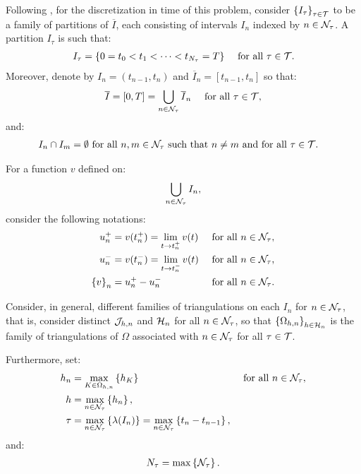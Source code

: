 Following \cite{Feistauer2007}, for the discretization in time of this problem, consider $\left\{ I_{\tau} \right\}_{\tau \in \mathcal{T}}$ to be a family of partitions of $\overline{I}$, each consisting of intervals $I_n$ indexed by $n \in \mathcal{N}_{\tau}$. A partition $I_{\tau}$ is such that:
\begin{align}
    I_{\tau} &= \left\{ 0 = t_0 < t_1 < \dots < t_{N_\tau} = T \right\} &\text{ for all } \tau \in \mathcal{T}.
\end{align}
Moreover, denote by $I_n = \left( t_{n - 1}, t_n \right)$ and $\overline{I}_n = \left[ t_{n - 1}, t_n \right]$ so that:
\begin{align}
    \overline{I} &= \left[ 0, T \right] = \bigcup_{n \in \mathcal{N}_{\tau}} \overline{I}_n &\text{ for all } \tau \in \mathcal{T},
\end{align}
and:
\begin{align}
    I_n \cap I_m = \emptyset &\text{ for all } n, m \in \mathcal{N}_{\tau} \text{ such that } n \neq m \text{ and for all } \tau \in \mathcal{T}.
\end{align}

For a function $v$ defined on:
\begin{align}
    \bigcup_{n \in \mathcal{N}_{\tau}} I_n,
\end{align}
consider the following notations:
\begin{align}
    u_n^+ &= v(t_n^+) = \lim_{t \rightarrow t_n^+} v(t) &\text{ for all } n \in \mathcal{N}_{\tau}, \\
    u_n^- &= v(t_n^-) = \lim_{t \rightarrow t_n^-} v(t) &\text{ for all } n \in \mathcal{N}_{\tau}, \\
    \left\{ v \right\}_n &= u_n^+ - u_n^- &\text{ for all } n \in \mathcal{N}_{\tau}.
\end{align}

Consider, in general, different families of triangulations on each $I_n$ for $n \in \mathcal{N}_{\tau}$, that is, consider distinct $\mathcal{J}_{h, n}$ and $\mathcal{H}_n$ for all $n \in \mathcal{N}_{\tau}$, so that $\left\{ \Omega_{h, n} \right\}_{h \in \mathcal{H}_n}$ is the family of triangulations of $\Omega$ associated with $n \in \mathcal{N}_{\tau}$ for all $\tau \in \mathcal{T}$.

Furthermore, set:
\begin{align}
    h_n &= \max_{K \in \Omega_{h, n}} \left\{ h_K \right\} &\text{ for all } n \in \mathcal{N}_{\tau}, \\
    h &= \max_{n \in \mathcal{N}_{\tau}} \left\{ h_n \right\}, \\
    \tau &= \max_{n \in \mathcal{N}_{\tau}} \left\{ \lambda(I_n) \right\} = \max_{n \in \mathcal{N}_{\tau}} \left\{ t_n - t_{n - 1} \right\},
\end{align}
and:
\begin{align}
    N_{\tau} = \max \left\{ \mathcal{N}_{\tau} \right\}.
\end{align}

